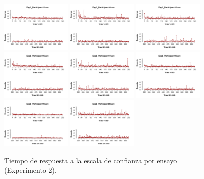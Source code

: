 \begin{figure}[th]
\includegraphics[width=0.30\textwidth]{Figures/RT2_Exp2_P13} \includegraphics[width=0.30\textwidth]{Figures/RT2_Exp2_P14} \includegraphics[width=0.30\textwidth]{Figures/RT2_Exp2_P15}
\includegraphics[width=0.30\textwidth]{Figures/RT2_Exp2_P16} \includegraphics[width=0.30\textwidth]{Figures/RT2_Exp2_P17} \includegraphics[width=0.30\textwidth]{Figures/RT2_Exp2_P18}
\includegraphics[width=0.30\textwidth]{Figures/RT2_Exp2_P19} \includegraphics[width=0.30\textwidth]{Figures/RT2_Exp2_P20} 
\caption[TR2_Exp2]{Tiempo de respuesta a la escala de confianza por ensayo (Experimento 2).}
\label{fig:RT2_E2}
\end{figure}



